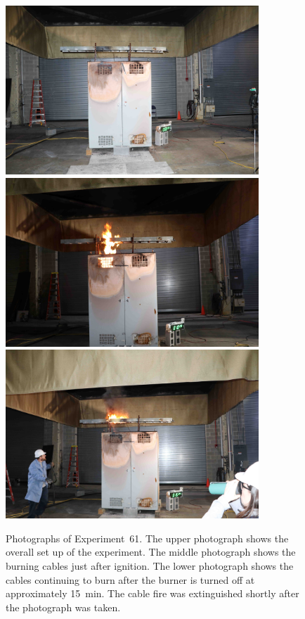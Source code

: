 \begin{figure}[p]
\centering
\includegraphics[height=2.50in]{../FIGURES/Test_61_setup} \\
\includegraphics[height=2.50in]{../FIGURES/Test_61_10_min_28_s} \\
\includegraphics[height=2.50in]{../FIGURES/Test_61_15_min_34_s}
\caption[Photographs of Experiment~61]{Photographs of Experiment~61. The upper photograph shows the overall set up of the experiment. The middle photograph shows the burning cables just after ignition. The lower photograph shows the cables continuing to burn after the burner is turned off at approximately 15~min. The cable fire was extinguished shortly after the photograph was taken. }
\label{fig:Test_61_photos}
\end{figure}



